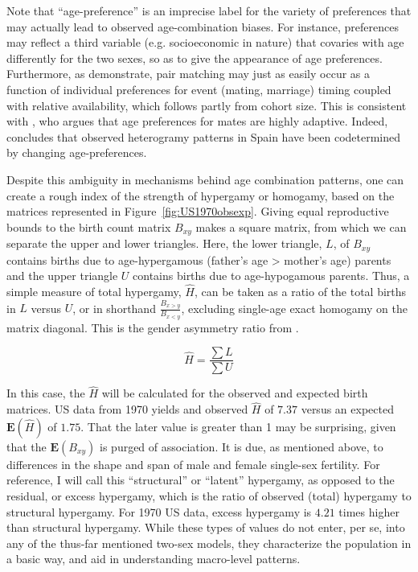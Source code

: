 Note that ``age-preference'' is an imprecise label for the variety
of preferences that may actually lead to observed age-combination biases. For
instance, preferences may reflect a third variable (e.g. socioeconomic
in nature) that covaries with age differently for the two sexes, so as to give
the appearance of age preferences. Furthermore, as \citet{bergstrom1994sweden}
demonstrate, pair matching may just as easily occur as a function of individual
preferences for event (mating, marriage) timing coupled with relative
availability, which follows partly from cohort size. This is consistent with
\citet{bhrolchain2001flexibility}, who argues that age preferences for
mates are highly adaptive. Indeed, \citet{esteve2009long} concludes that
observed heterogramy patterns in Spain have been codetermined by changing
age-preferences.

Despite this ambiguity in mechanisms behind age combination patterns, one can
create a rough index of the strength of hypergamy or homogamy, based on the
matrices represented in Figure~\ref{fig:US1970obsexp}. Giving equal reproductive
bounds to the birth count matrix $B_{xy}$ makes a square matrix, from which we
can separate the upper and lower triangles. Here, the lower triangle, $L$,
of $B_{xy}$ contains births due to age-hypergamous (father's age > mother's
age) parents and the upper triangle $U$ contains births due to
age-hypogamous parents. Thus, a simple measure of total hypergamy, $\widehat{H}$, 
can be taken as a ratio of the total births in $L$ versus $U$, or in shorthand 
$\frac{B_{x>y}}{B_{x<y}}$, excluding single-age exact homogamy on the matrix
diagonal. This is the gender asymmetry ratio from \citet{esteve2009long}.

\begin{equation}
\widehat{H} = \frac{\sum L}{\sum U} 
\end{equation}

In this case, the $\widehat{H}$ will be calculated for the observed and expected
birth matrices. US data from 1970 yields and observed $\widehat{H}$ of $7.37$
versus an expected $\textbf{E}(\widehat{H})$ of $1.75$. That the later value is
greater than 1 may be surprising, given that the $\textbf{E}(B_{xy})$ is purged
of association. It is due, as mentioned above, to differences in the shape
and span of male and female single-sex fertility. For reference, I
will call this ``structural'' or ``latent'' hypergamy, as opposed to the
residual, or excess hypergamy, which is the ratio of observed (total) hypergamy to
structural hypergamy. For 1970 US data, excess hypergamy is $4.21$ times higher
than structural hypergamy. While these types of values do not enter, per se, 
into any of the thus-far mentioned two-sex models, they characterize the 
population in a basic way, and aid in understanding macro-level patterns. 

